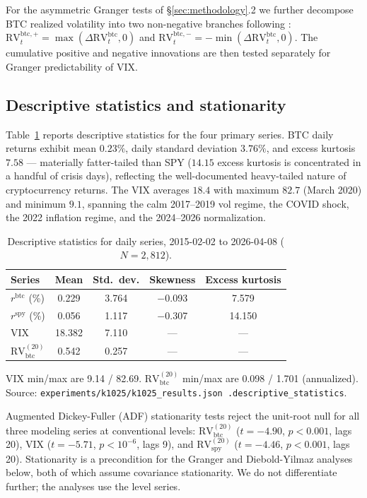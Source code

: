 \documentclass[11pt,a4paper]{article}
\begin{document}
For the asymmetric Granger tests of \S\ref{sec:methodology}.2 we further decompose BTC realized volatility into two non-negative branches following \citet{hatemi2012}: $\text{RV}^{\text{btc},+}_t = \max(\Delta \text{RV}^{\text{btc}}_t, 0)$ and $\text{RV}^{\text{btc},-}_t = -\min(\Delta \text{RV}^{\text{btc}}_t, 0)$. The cumulative positive and negative innovations are then tested separately for Granger predictability of VIX.

\subsection{Descriptive statistics and stationarity}

Table~\ref{tab:descriptive} reports descriptive statistics for the four primary series. BTC daily returns exhibit mean $0.23\%$, daily standard deviation $3.76\%$, and excess kurtosis $7.58$ --- materially fatter-tailed than SPY ($14.15$ excess kurtosis is concentrated in a handful of crisis days), reflecting the well-documented heavy-tailed nature of cryptocurrency returns. The VIX averages $18.4$ with maximum $82.7$ (March 2020) and minimum $9.1$, spanning the calm 2017--2019 vol regime, the COVID shock, the 2022 inflation regime, and the 2024--2026 normalization.

\begin{table}[H]
\centering
\caption{Descriptive statistics for daily series, 2015-02-02 to 2026-04-08 ($N = 2{,}812$).}
\label{tab:descriptive}
\begin{tabular}{lcccc}
\toprule
Series & Mean & Std.\ dev. & Skewness & Excess kurtosis \\
\midrule
$r^{\text{btc}}$ (\%) & 0.229 & 3.764 & $-$0.093 & 7.579 \\
$r^{\text{spy}}$ (\%) & 0.056 & 1.117 & $-$0.307 & 14.150 \\
VIX & 18.382 & 7.110 & --- & --- \\
$\text{RV}^{(20)}_{\text{btc}}$ & 0.542 & 0.257 & --- & --- \\
\bottomrule
\end{tabular}
\begin{flushleft}
\footnotesize VIX min/max are 9.14 / 82.69. $\text{RV}^{(20)}_{\text{btc}}$ min/max are 0.098 / 1.701 (annualized). Source: \texttt{experiments/k1025/k1025\_results.json .descriptive\_statistics}.
\end{flushleft}
\end{table}

Augmented Dickey-Fuller (ADF) stationarity tests reject the unit-root null for all three modeling series at conventional levels: $\text{RV}^{(20)}_{\text{btc}}$ ($t = -4.90$, $p < 0.001$, lags 20), VIX ($t = -5.71$, $p < 10^{-6}$, lags 9), and $\text{RV}^{(20)}_{\text{spy}}$ ($t = -4.46$, $p < 0.001$, lags 20).%
 Stationarity is a precondition for the Granger and Diebold-Yilmaz analyses below, both of which assume covariance stationarity. We do not differentiate further; the analyses use the level series.
\end{document}
